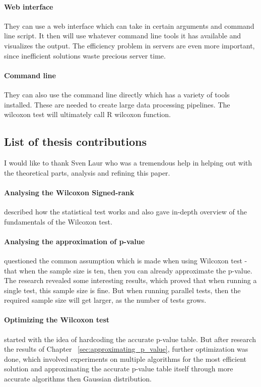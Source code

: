 \documentclass[12pt]{article}
\begin{document}
\paragraph{Web interface}
They can use a web interface which can take in certain arguments and command line script. It then will use whatever command line tools it has available and visualizes the output. The efficiency problem in servers are even more important, since inefficient solutions waste precious server time.

\paragraph{Command line}
They can also use the command line directly which has a variety of tools installed. These are needed to create large data processing pipelines. The wilcoxon test will ultimately call R wilcoxon function.

\subsection{List of thesis contributions}

I would like to thank Sven Laur who was a tremendous help in helping out with the theoretical parts, analysis and refining this paper.

\paragraph{Analysing the Wilcoxon Signed-rank} described how the statistical test works and also gave in-depth overview of the fundamentals of the Wilcoxon test.

\paragraph{Analysing the approximation of p-value} questioned the common assumption which is made when using Wilcoxon test - that when the sample size is ten, then you can already approximate the p-value. The research revealed some interesting results, which proved that when running a single test, this sample size is fine. But when running parallel tests, then the required sample size will get larger, as the number of tests grows.

\paragraph{Optimizing the Wilcoxon test} started with the idea of hardcoding the accurate p-value table. But after research the results of Chapter ~\ref{sec:approximating_p_value}, further optimization was done, which involved experiments on multiple algorithms for the most efficient solution and approximating the accurate p-value table itself through more accurate algorithms then Gaussian distribution.
\end{document}
